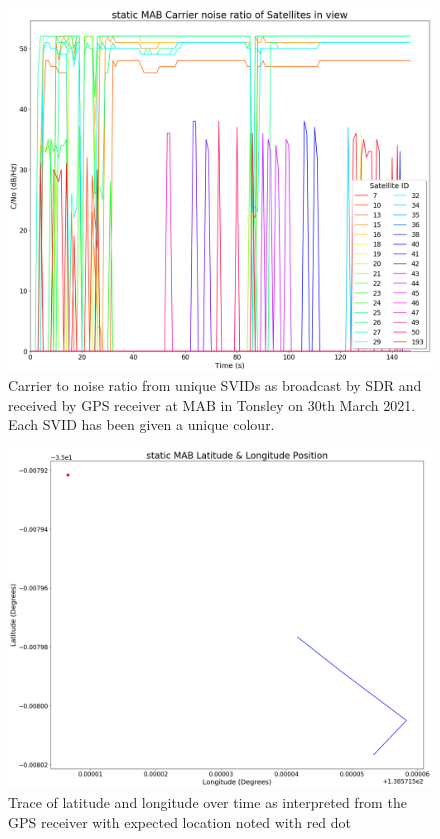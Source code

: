 \begin{figure}[h]
    \begin{centering}
        \includegraphics[width=14cm,keepaspectratio]{Figures/2021_3_30_static_MAB Carrier noise ratio.png}
        \caption{Carrier to noise ratio from unique SVIDs as broadcast by SDR and received by GPS receiver at MAB in Tonsley on 30th March 2021. Each SVID has been given a unique colour.}
        \label{fig:MABStaticCNo}
    \end{centering}
\end{figure}

\begin{figure}[h]
    \begin{centering}
        \includegraphics[width=14cm,keepaspectratio]{Figures/2021_3_30_static_MAB Lat long position.png}
        \caption{Trace of latitude and longitude over time as interpreted from the GPS receiver with expected location noted with red dot}
        \label{fig:MABStaticCoord}
    \end{centering}
\end{figure}

